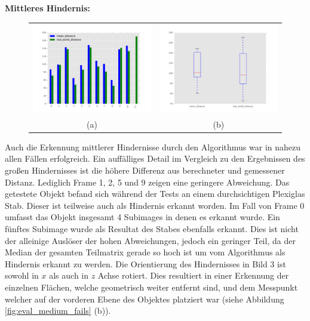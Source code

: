 	\noindent
	\textbf{Mittleres Hindernis:}\\
	\begin{figure}[h]
		\centering
		\begin{tabular}{cc}
		\includegraphics[width=7cm]{img/evaluation/medium_bar}&
		\includegraphics[width=7cm]{img/evaluation/medium_box}\\
		(a) &  (b)
		\end{tabular}
	    \caption{}
	    \label{fig:eval_medium}
	\end{figure}
	
	\noindent
	Auch die Erkennung mittlerer Hindernisse durch den Algorithmus war in nahezu allen Fällen erfolgreich. Ein auffälliges Detail im Vergleich zu den Ergebnissen des großen Hindernisses ist die höhere Differenz aus berechneter und gemessener Distanz. Lediglich Frame 1, 2, 5 und 9 zeigen eine geringere Abweichung. Das getestete Objekt befand sich während der Tests an einem durchsichtigen Plexiglas Stab. Dieser ist teilweise auch als Hindernis erkannt worden. Im Fall von Frame 0 umfasst das Objekt insgesamt 4 Subimages in denen es erkannt wurde. Ein fünftes Subimage wurde als Resultat des Stabes ebenfalls erkannt. Dies ist nicht der alleinige Auslöser der hohen Abweichungen, jedoch ein geringer Teil, da der Median der gesamten Teilmatrix gerade so hoch ist um vom Algorithmus als Hindernis erkannt zu werden. Die Orientierung des Hindernisses in Bild 3 ist sowohl in $x$ als auch in $z$ Achse rotiert. Dies resultiert in einer Erkennung der einzelnen Flächen, welche geometrisch weiter entfernt sind, und dem Messpunkt welcher auf der vorderen Ebene des Objektes platziert war (siehe Abbildung \ref{fig:eval_medium_fails} (b)). 
	
